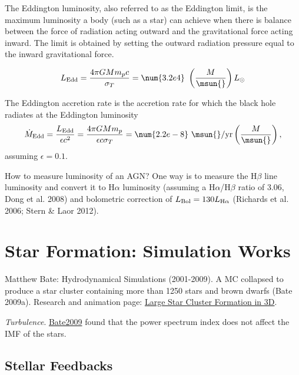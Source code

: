 
The Eddington luminosity, also referred to as the Eddington limit, is the maximum luminosity a body (such as a star) can achieve when there is balance between the force of radiation acting outward and the gravitational force acting inward. The limit is obtained by setting the outward radiation pressure equal to the inward gravitational force.

\begin{equation}
  \label{eq:eddington}
  L_{\rm Edd} = \frac{4 \pi G M m_p c}{\sigma_T} = \num{3.2e4} \ \left( \frac{M}{\msun{}} \right) L_\odot 
\end{equation}

The Eddington accretion rate is the accretion rate for which the black hole radiates at the Eddington luminosity
\begin{equation}
  \label{eq:eddacc}
  \dot{M}_{\rm Edd} = \frac{L_{\rm Edd}}{\epsilon c^2} = \frac{4 \pi G M m_p}{\epsilon c \sigma_T} = \num{2.2e-8} \ \msun{}/{\rm yr} \left( \frac{M}{\msun{}} \right),
\end{equation}
assuming $\epsilon = 0.1$.

How to measure luminosity of an AGN? One way is to measure the H$\beta{}$ line luminosity and convert it to H$\alpha$ luminosity (assuming a H$\alpha$/H$\beta$ ratio of 3.06, Dong et al. 2008) and bolometric correction of $L_{\rm Bol} = 130 L_{{\rm H}\alpha}$ (Richards et al. 2006; Stern \& Laor 2012). 


\section{Star Formation: Simulation Works}
\label{sec:sf-sim}

Matthew Bate: Hydrodynamical Simulations (2001-2009). A MC collapsed to produce a star cluster containing more than 1250 stars and brown dwarfs (Bate 2009a). Research and animation page: \href{https://www.astro.ex.ac.uk/people/mbate/Cluster/index.html}{Large Star Cluster Formation in 3D}. 

\emph{Turbulence}. \href{https://www.astro.ex.ac.uk/people/mbate/Cluster/cluster4.html}{Bate2009} found that the power spectrum index does not affect the IMF of the stars. 

\subsection{Stellar Feedbacks}
\label{sec:org48d2776}
